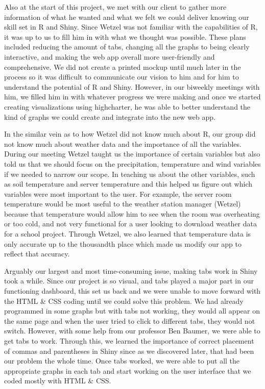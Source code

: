 \documentclass[10pt,letterpaper]{article}
\begin{document}
Also at the start of this project, we met with our client to gather more
information of what he wanted and what we felt we could deliver knowing
our skill set in R and Shiny. Since Wetzel was not familiar with the
capabilities of R, it was up to us to fill him in with what we thought
was possible. These plans included reducing the amount of tabs, changing
all the graphs to being clearly interactive, and making the web app
overall more user-friendly and comprehensive. We did not create a
printed mockup until much later in the process so it was difficult to
communicate our vision to him and for him to understand the potential of
R and Shiny. However, in our biweekly meetings with him, we filled him
in with whatever progress we were making and once we started creating
visualizations using highcharter, he was able to better understand the
kind of graphs we could create and integrate into the new web app.

In the similar vein as to how Wetzel did not know much about R, our
group did not know much about weather data and the importance of all the
variables. During our meeting Wetzel taught us the importance of certain
variables but also told us that we should focus on the precipitation,
temperature and wind variables if we needed to narrow our scope. In
teaching us about the other variables, such as soil temperature and
server temperature and this helped us figure out which variables were
most important to the user. For example, the server room temperature
would be most useful to the weather station manager (Wetzel) because
that temperature would allow him to see when the room was overheating or
too cold, and not very functional for a user looking to download weather
data for a school project. Through Wetzel, we also learned that
temperature data is only accurate up to the thousandth place which made
us modify our app to reflect that accuracy.

Arguably our largest and most time-consuming issue, making tabs work in
Shiny took a while. Since our project is so visual, and tabs played a
major part in our functioning dashboard, this set us back and we were
unable to move forward with the HTML \& CSS coding until we could solve
this problem. We had already programmed in some graphs but with tabs not
working, they would all appear on the same page and when the user tried
to click to different tabs, they would not switch. However, with some
help from our professor Ben Baumer, we were able to get tabs to work.
Through this, we learned the importance of correct placement of commas
and parentheses in Shiny since as we discovered later, that had been our
problem the whole time. Once tabs worked, we were able to put all the
appropriate graphs in each tab and start working on the user interface
that we coded mostly with HTML \& CSS.
\end{document}
